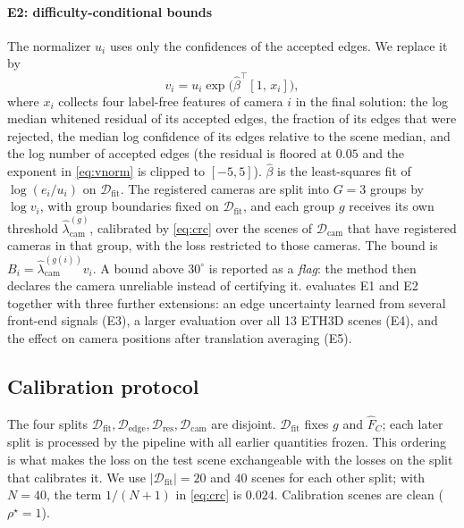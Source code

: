 \paragraph*{E2: difficulty-conditional bounds} The normalizer $u_i$ uses only the confidences of the accepted edges. We replace it by
\begin{equation}\label{eq:vnorm}
v_i=u_i\exp\big(\hat\beta^{\top}[1,\,x_i]\big),
\end{equation}
where $x_i$ collects four label-free features of camera $i$ in the final solution: the log median whitened residual of its accepted edges, the fraction of its edges that were rejected, the median log confidence of its edges relative to the scene median, and the log number of accepted edges (the residual is floored at $0.05$ and the exponent in \eqref{eq:vnorm} is clipped to $[-5,5]$). $\hat\beta$ is the least-squares fit of $\log(e_i/u_i)$ on $\mathcal{D}_{\mathrm{fit}}$. The registered cameras are split into $G=3$ groups by $\log v_i$, with group boundaries fixed on $\mathcal{D}_{\mathrm{fit}}$, and each group $g$ receives its own threshold $\hat\lambda_{\mathrm{cam}}^{(g)}$, calibrated by \eqref{eq:crc} over the scenes of $\mathcal{D}_{\mathrm{cam}}$ that have registered cameras in that group, with the loss restricted to those cameras. The bound is $B_i=\hat\lambda^{(g(i))}_{\mathrm{cam}}v_i$. A bound above $30^\circ$ is reported as a \emph{flag}: the method then declares the camera unreliable instead of certifying it.  evaluates E1 and E2 together with three further extensions: an edge uncertainty learned from several front-end signals (E3), a larger evaluation over all 13 ETH3D scenes (E4), and the effect on camera positions after translation averaging (E5).

\subsection{Calibration protocol}
The four splits $\mathcal{D}_{\mathrm{fit}},\mathcal{D}_{\mathrm{edge}},\mathcal{D}_{\mathrm{res}},\mathcal{D}_{\mathrm{cam}}$ are disjoint. $\mathcal{D}_{\mathrm{fit}}$ fixes $g$ and $\hat F_C$; each later split is processed by the pipeline with all earlier quantities frozen. This ordering is what makes the loss on the test scene exchangeable with the losses on the split that calibrates it. We use $|\mathcal{D}_{\mathrm{fit}}|=20$ and $40$ scenes for each other split; with $N=40$, the term $1/(N+1)$ in \eqref{eq:crc} is $0.024$. Calibration scenes are clean ($\rho^\star=1$).

